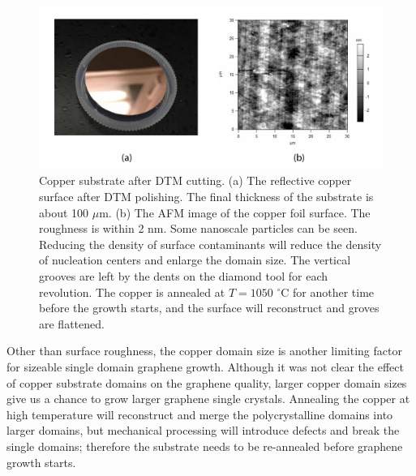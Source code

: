 \documentclass[pdflatex, sectionletters, 12pt]{pittetd}    %
\begin{document}
\begin{figure}[h!]
	\centering
	\includegraphics[width=1.0\textwidth]{Drawing/DTMCopper.pdf}
	\caption{Copper substrate after DTM cutting. (a) The reflective copper surface after DTM polishing. The final thickness of the substrate is about 100 $\mu$m. (b) The AFM image of the copper foil surface. The roughness is within 2 nm. Some nanoscale particles can be seen. Reducing the density of surface contaminants will reduce the density of nucleation centers and enlarge the domain size. The vertical grooves are left by the dents on the diamond tool for each revolution. The copper is annealed at $T = 1050$ $^{\circ}$C for another time before the growth starts, and the surface will reconstruct and groves are flattened.}
	\label{FIG:DTMFinishing}
\end{figure}

Other than surface roughness, the copper domain size is another limiting factor for sizeable single domain graphene growth. Although it was not clear the effect of copper substrate domains on the graphene quality\cite{kim2012direct, wang2012controllable, wofford2010graphene}, larger copper domain sizes give us a chance to grow larger graphene single crystals. Annealing the copper at high temperature will reconstruct and merge the polycrystalline domains into larger domains, but mechanical processing will introduce defects and break the single domains; therefore the substrate needs to be re-annealed before graphene growth starts.
\end{document}
